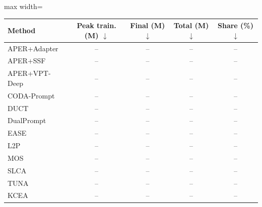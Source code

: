 \renewcommand{\arraystretch}{0.95}
\begin{adjustbox}{max width=\textwidth}
\footnotesize
\begin{tabular}{l c c c c}
\toprule
Method & \textbf{Peak train. (M)} $\downarrow$ & \textbf{Final (M)} $\downarrow$ & \textbf{Total (M)} $\downarrow$ & \textbf{Share (\%)} $\downarrow$ \\
\midrule
APER+Adapter & -- & -- & -- & -- \\
APER+SSF & -- & -- & -- & -- \\
APER+VPT-Deep & -- & -- & -- & -- \\
CODA-Prompt & -- & -- & -- & -- \\
DUCT & -- & -- & -- & -- \\
DualPrompt & -- & -- & -- & -- \\
EASE & -- & -- & -- & -- \\
L2P & -- & -- & -- & -- \\
MOS & -- & -- & -- & -- \\
SLCA & -- & -- & -- & -- \\
TUNA & -- & -- & -- & -- \\
\midrule
KCEA & -- & -- & -- & -- \\
\bottomrule
\end{tabular}
\end{adjustbox}